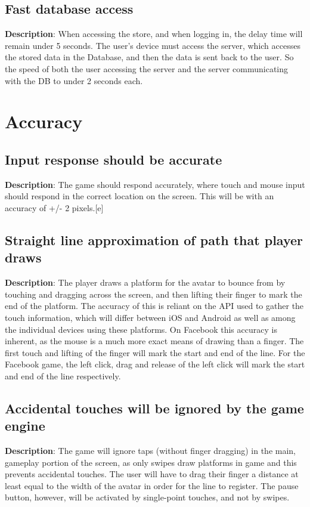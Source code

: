 \subsection{Fast database access}
\textbf{Description}: When accessing the store, and when logging in, the delay
time will remain under 5 seconds. The user\textquoteright{}s device
must access the server, which accesses the stored data in the Database,
and then the data is sent back to the user. So the speed of both the
user accessing the server and the server communicating with the DB
to under 2 seconds each.

\section{Accuracy}
\renewcommand\thesubsection{ACC-%
\ifnum\value{subsection}<10 0\fi
\arabic{subsection}}
\subsection{Input response should be accurate}
\textbf{Description}: The game should respond accurately, where touch and mouse
input should respond in the correct location on the screen. This will
be with an accuracy of +/- 2 pixels.{[}e{]}

\subsection{Straight line approximation of path that player draws}
\textbf{Description}: The player draws a platform for the avatar to bounce
from by touching and dragging across the screen, and then lifting
their finger to mark the end of the platform. The accuracy of this
is reliant on the API used to gather the touch information, which
will differ between iOS and Android as well as among the individual
devices using these platforms. On Facebook this accuracy is inherent,
as the mouse is a much more exact means of drawing than a finger.
The first touch and lifting of the finger will mark the start and
end of the line. For the Facebook game, the left click, drag and release
of the left click will mark the start and end of the line respectively.

\subsection{Accidental touches will be ignored by the game engine}
\textbf{Description}: The game will ignore taps (without finger dragging) in
the main, gameplay portion of the screen, as only swipes draw platforms
in game and this prevents accidental touches. The user will have to
drag their finger a distance at least equal to the width of the avatar
in order for the line to register. The pause button, however, will
be activated by single-point touches, and not by swipes.

